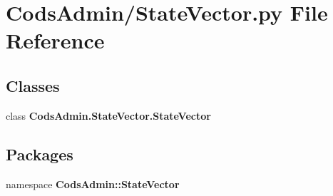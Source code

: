 \section{\-Cods\-Admin/\-State\-Vector.py \-File \-Reference}
\label{_state_vector_8py}
\subsection*{\-Classes}
\begin{DoxyCompactItemize}
\item 
class {\bf \-Cods\-Admin.\-State\-Vector.\-State\-Vector}
\end{DoxyCompactItemize}
\subsection*{\-Packages}
\begin{DoxyCompactItemize}
\item 
namespace {\bf \-Cods\-Admin\-::\-State\-Vector}
\end{DoxyCompactItemize}
